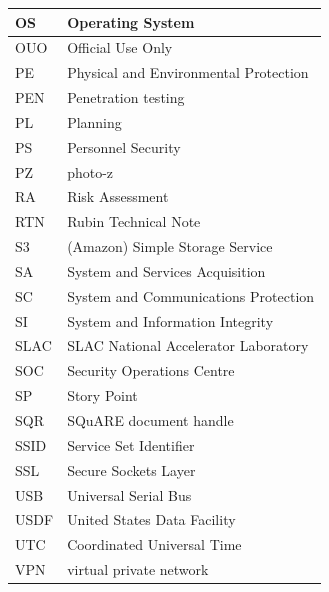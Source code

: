 \begin{longtable}{p{}p{}}
OS & Operating System \\\hline
OUO & Official Use Only \\\hline
PE & Physical and Environmental Protection \\\hline
PEN & Penetration testing \\\hline
PL & Planning \\\hline
PS & Personnel Security \\\hline
PZ & photo-z \\\hline
RA & Risk Assessment \\\hline
RTN & Rubin Technical Note \\\hline
S3 & (Amazon) Simple Storage Service \\\hline
SA & System and Services Acquisition \\\hline
SC & System and Communications Protection \\\hline
SI & System and Information Integrity \\\hline
SLAC & SLAC National Accelerator Laboratory \\\hline
SOC & Security Operations Centre \\\hline
SP & Story Point \\\hline
SQR & SQuARE document handle \\\hline
SSID & Service Set Identifier \\\hline
SSL & Secure Sockets Layer \\\hline
USB & Universal Serial Bus \\\hline
USDF & United States Data Facility \\\hline
UTC & Coordinated Universal Time \\\hline
VPN & virtual private network \\\hline
\end{longtable}

